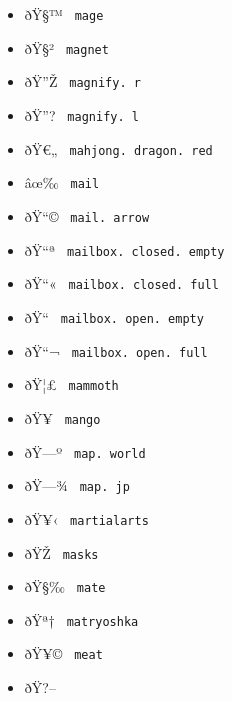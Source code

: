 \begin{itemize}
\item
  \label{symbol-mage}{{ ðŸ§™ } \texttt{\ mage\ }}
\item
  \label{symbol-magnet}{{ ðŸ§² } \texttt{\ magnet\ }}
\item
  \label{symbol-magnify.r}{{ ðŸ''Ž }
  \texttt{\ magnify.\ r\ }}
\item
  \label{symbol-magnify.l}{{ ðŸ''? }
  \texttt{\ magnify.\ l\ }}
\item
  \label{symbol-mahjong.dragon.red}{{ ðŸ€„ }
  \texttt{\ mahjong.\ dragon.\ red\ }}
\item
  \label{symbol-mail}{{ âœ‰ } \texttt{\ mail\ }}
\item
  \label{symbol-mail.arrow}{{ ðŸ``© }
  \texttt{\ mail.\ arrow\ }}
\item
  \label{symbol-mailbox.closed.empty}{{ ðŸ``ª }
  \texttt{\ mailbox.\ closed.\ empty\ }}
\item
  \label{symbol-mailbox.closed.full}{{ ðŸ``« }
  \texttt{\ mailbox.\ closed.\ full\ }}
\item
  \label{symbol-mailbox.open.empty}{{ ðŸ``­ }
  \texttt{\ mailbox.\ open.\ empty\ }}
\item
  \label{symbol-mailbox.open.full}{{ ðŸ``¬ }
  \texttt{\ mailbox.\ open.\ full\ }}
\item
  \label{symbol-mammoth}{{ ðŸ¦£ } \texttt{\ mammoth\ }}
\item
  \label{symbol-mango}{{ ðŸ¥­ } \texttt{\ mango\ }}
\item
  \label{symbol-map.world}{{ ðŸ---º }
  \texttt{\ map.\ world\ }}
\item
  \label{symbol-map.jp}{{ ðŸ---¾ } \texttt{\ map.\ jp\ }}
\item
  \label{symbol-martialarts}{{ ðŸ¥‹ }
  \texttt{\ martialarts\ }}
\item
  \label{symbol-masks}{{ ðŸŽ­ } \texttt{\ masks\ }}
\item
  \label{symbol-mate}{{ ðŸ§‰ } \texttt{\ mate\ }}
\item
  \label{symbol-matryoshka}{{ ðŸª† }
  \texttt{\ matryoshka\ }}
\item
  \label{symbol-meat}{{ ðŸ¥© } \texttt{\ meat\ }}
\item
  \label{symbol-meat.bone}{{ ðŸ?-- }
}
\end{itemize}
